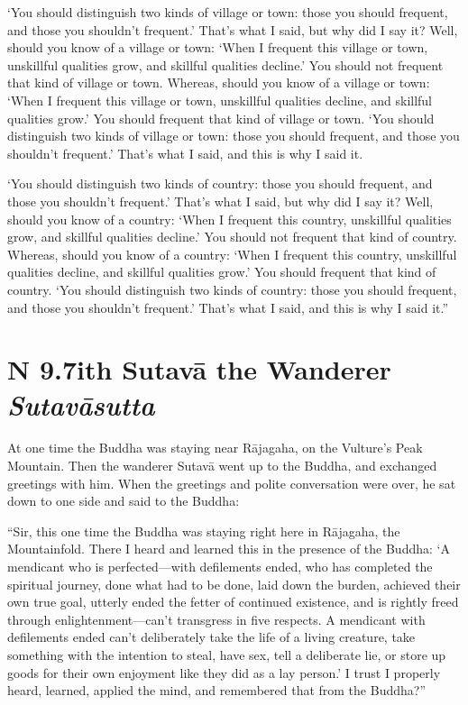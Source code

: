 \documentclass[12pt,openany]{book}%
\newcommand*{\suttatitleacronym}[1]{\smaller[2]{#1}\vspace*{.3em}}
\newcommand*{\suttatitletranslation}[1]{\linebreak{#1}}
\newcommand*{\suttatitleroot}[1]{\linebreak\smaller[2]\itshape{#1}}
\newcommand*{\tocacronym}[1]{\hspace*{-3.3em}{#1}\quad}
\newcommand*{\toctranslation}[1]{#1}
\newcommand*{\tocroot}[1]{(\textit{#1})}
\begin{document}
‘You should distinguish two kinds of village or town: those you should frequent, and those you shouldn’t frequent.’ That’s what I said, but why did I say it? Well, should you know of a village or town: ‘When I frequent this village or town, unskillful qualities grow, and skillful qualities decline.’ You should not frequent that kind of village or town. Whereas, should you know of a village or town: ‘When I frequent this village or town, unskillful qualities decline, and skillful qualities grow.’ You should frequent that kind of village or town. ‘You should distinguish two kinds of village or town: those you should frequent, and those you shouldn’t frequent.’ That’s what I said, and this is why I said it. 

‘You should distinguish two kinds of country: those you should frequent, and those you shouldn’t frequent.’ That’s what I said, but why did I say it? Well, should you know of a country: ‘When I frequent this country, unskillful qualities grow, and skillful qualities decline.’ You should not frequent that kind of country. Whereas, should you know of a country: ‘When I frequent this country, unskillful qualities decline, and skillful qualities grow.’ You should frequent that kind of country. ‘You should distinguish two kinds of country: those you should frequent, and those you shouldn’t frequent.’ That’s what I said, and this is why I said it.” 

%
\section*{{\suttatitleacronym AN 9.7}{\suttatitletranslation With Sutavā the Wanderer }{\suttatitleroot Sutavāsutta}}
\addcontentsline{toc}{section}{\tocacronym{AN 9.7} \toctranslation{With Sutavā the Wanderer } \tocroot{Sutavāsutta}}

At one time the Buddha was staying near \textsanskrit{Rājagaha}, on the Vulture’s Peak Mountain. Then the wanderer \textsanskrit{Sutavā} went up to the Buddha, and exchanged greetings with him. When the greetings and polite conversation were over, he sat down to one side and said to the Buddha: 

“Sir, this one time the Buddha was staying right here in \textsanskrit{Rājagaha}, the Mountainfold. There I heard and learned this in the presence of the Buddha: ‘A mendicant who is perfected—with defilements ended, who has completed the spiritual journey, done what had to be done, laid down the burden, achieved their own true goal, utterly ended the fetter of continued existence, and is rightly freed through enlightenment—can’t transgress in five respects. A mendicant with defilements ended can’t deliberately take the life of a living creature, take something with the intention to steal, have sex, tell a deliberate lie, or store up goods for their own enjoyment like they did as a lay person.’ I trust I properly heard, learned, applied the mind, and remembered that from the Buddha?” 
\end{document}

